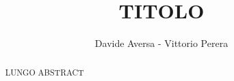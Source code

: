 \documentclass[a4paper,10pt]{article}
\title{TITOLO}
\author{Davide Aversa - Vittorio Perera}
\begin{document}
\maketitle

\begin{abstract}

LUNGO ABSTRACT

\end{abstract}
















\end{document}

